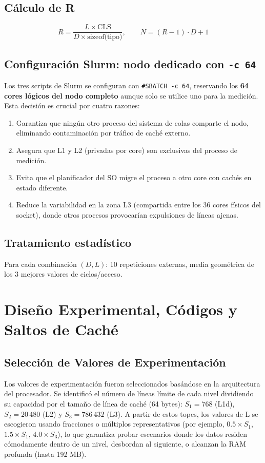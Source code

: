 \documentclass[12pt,a4paper]{article}
\begin{document}
\subsection{Cálculo de R}

\[
  R = \frac{L \times \text{CLS}}{D \times \text{sizeof(tipo)}}, \qquad N = (R-1) \cdot D + 1
\]

\subsection{Configuración Slurm: nodo dedicado con \texttt{-c 64}}

Los tres scripts de Slurm se configuran con \texttt{\#SBATCH -c 64}, reservando los \textbf{64 cores lógicos del nodo completo} aunque solo se utilice uno para la medición.
Esta decisión es crucial por cuatro razones:

\begin{enumerate}[leftmargin=1.5em]
  \item Garantiza que ningún otro proceso del sistema de colas comparte el nodo, eliminando contaminación por tráfico de caché externo.
  \item Asegura que L1 y L2 (privadas por core) son exclusivas del proceso de medición.
  \item Evita que el planificador del SO migre el proceso a otro core con cachés en estado diferente.
  \item Reduce la variabilidad en la zona L3 (compartida entre los 36 cores físicos del socket), donde otros procesos provocarían expulsiones de líneas ajenas.
\end{enumerate}

\subsection{Tratamiento estadístico}

Para cada combinación $(D, L)$: 10 repeticiones externas, media geométrica de los 3 mejores valores de ciclos/acceso.

\section{Diseño Experimental, Códigos y Saltos de Caché}

\subsection{Selección de Valores de Experimentación}
Los valores de experimentación fueron seleccionados basándose en la arquitectura del procesador. Se identificó el número de líneas límite de cada nivel dividiendo su capacidad por el tamaño de línea de caché (64 bytes): $S_1 = 768$ (L1d), $S_2 = 20\,480$ (L2) y $S_3 = 786\,432$ (L3). A partir de estos topes, los valores de L se escogieron usando fracciones o múltiplos representativos (por ejemplo, $0.5 \times S_1$, $1.5 \times S_1$, $4.0 \times S_3$), lo que garantiza probar escenarios donde los datos residen cómodamente dentro de un nivel, desbordan al siguiente, o alcanzan la RAM profunda (hasta 192 MB).
\end{document}
